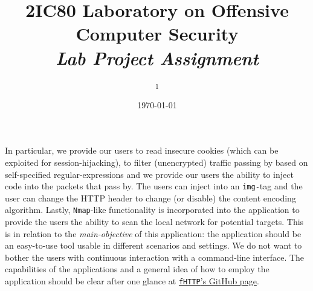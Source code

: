 \documentclass[10pt, a4paper, twocolumn]{article} %
\title{2IC80 Laboratory on Offensive Computer Security\\
	\emph{Lab Project Assignment}} %
\author{
	\authorstyle{Abdel K. Bokharouss\textsuperscript{1} and Adriaan Knapen\textsuperscript{1}} %
	\newline\newline %
	\textsuperscript{1}\institution{Eindhoven University of Technology, The Netherlands}\\ %
}
\date{\today} %
\begin{document}
\maketitle %

\thispagestyle{firstpage} %



In particular, we provide our users to read insecure cookies (which can be exploited for session-hijacking), to filter (unencrypted) traffic passing by based on self-specified regular-expressions and we provide our users the ability to inject code into the packets that pass by. The users can inject into an \texttt{img-}tag and the user can change the  HTTP header to change (or disable) the content encoding algorithm. Lastly, \texttt{Nmap}-like functionality is incorporated into the application to provide the users the ability to scan the local network for potential targets. This is in relation to the \textit{main-objective} of this application: the application should be an easy-to-use tool usable in different scenarios and settings. We do not want to bother the users with continuous interaction with a command-line interface. The capabilities of the applications and a general idea of how to employ the application should be clear after one glance at \href{https://github.com/akbokha/fhttp}{\texttt{fHTTP}'s GitHub page}.


\end{document}
